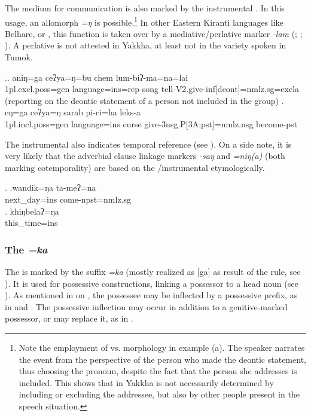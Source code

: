 		
The medium for communication is also marked by the instrumental \Next. In this usage, an allomorph \emph{=ŋ} is possible.\footnote{Note the employment of  vs.  morphology in example (a). The speaker narrates the event from the perspective of the person who made the deontic statement, thus choosing the  pronoun, despite the fact that the person she addresses is included. This shows that  in Yakkha is not necessarily determined by including or excluding the addressee, but also by other people present in the speech situation.} In other Eastern Kiranti languages like Belhare,  or , this function is taken over by a mediative/perlative marker \emph{-lam} (\citealt[549]{Bickel2003Belhare}; \citealt[83]{Schikowski2012_Morphology}; \citealt[51]{Driem1987A-grammar}). A perlative  is not attested in Yakkha, at least not in the variety spoken in Tumok.

\ex.\ag. aniŋ=ga ceʔya=ŋ=bu chem lum-biʔ-ma=na=lai\\
{\sc 1pl.excl.poss=gen} language{\sc =ins=rep} song tell{\sc -V2.give-inf[deont]=nmlz.sg=excla}\\
 (reporting on the deontic statement of a person not included in the group) 
\bg. eŋ=ga            ceʔya=ŋ       sarab pi-ci=ha leks-a\\
		{\sc 1pl.incl.poss=gen} language{\sc =ins} curse give{\sc -3nsg.P[3A;pst]=nmlz.nsg} become{\sc [3sg]-pst}\\
		
		
The instrumental also indicates temporal reference (see \Next). On a side note,  it is very likely that the adverbial clause linkage markers  \emph{-saŋ} and \emph{=niŋ(a)} (both marking cotemporality)  are based on the /instrumental  etymologically.
		
		\ex. \ag.wandik=ŋa ta-meʔ=na\\
		next\_day{\sc =ins} come{\sc [3sg]-npst=nmlz.sg}\\
		\bg. khiŋbelaʔ=ŋa\\
		this\_time{\sc =ins}\\
	
	
\subsubsection{The  \emph{=ka} }\label{case-gen}		
The   is marked by the suffix \emph{=ka} (mostly realized as [ga] as  result of the  rule, see ). It is used for possessive constructions, linking a possessor to a head noun (see \Next). As mentioned in  on , the possessee may be inflected by a possessive prefix, as in \Next[b] and \Next[c]. The possessive inflection may occur in addition to a genitive-marked possessor, or may replace it, as in \Next[c].

